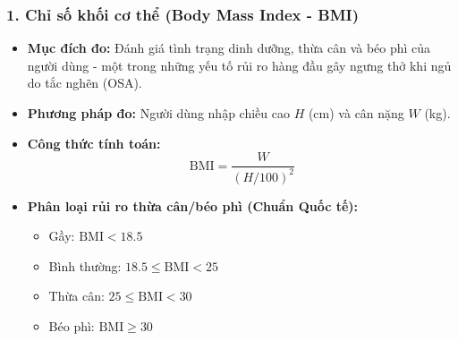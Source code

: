 \documentclass[12pt,a4paper]{article}
\begin{document}
\subsubsection*{1. Chỉ số khối cơ thể (Body Mass Index - BMI)}
\begin{itemize}
    \item \textbf{Mục đích đo:} Đánh giá tình trạng dinh dưỡng, thừa cân và béo phì của người dùng - một trong những yếu tố rủi ro hàng đầu gây ngưng thở khi ngủ do tắc nghẽn (OSA).
    \item \textbf{Phương pháp đo:} Người dùng nhập chiều cao $H$ (cm) và cân nặng $W$ (kg).
    \item \textbf{Công thức tính toán:}
    \begin{equation}
        \text{BMI} = \frac{W}{(H/100)^2}
    \end{equation}
    \item \textbf{Phân loại rủi ro thừa cân/béo phì (Chuẩn Quốc tế):} 
    \begin{itemize}
        \item Gầy: $\text{BMI} < 18.5$
        \item Bình thường: $18.5 \le \text{BMI} < 25$
        \item Thừa cân: $25 \le \text{BMI} < 30$
        \item Béo phì: $\text{BMI} \ge 30$
    \end{itemize}
\end{itemize}
\end{document}
